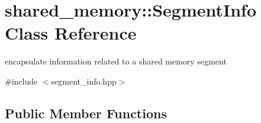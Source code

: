 \hypertarget{classshared__memory_1_1SegmentInfo}{}\section{shared\+\_\+memory\+:\+:Segment\+Info Class Reference}
\label{classshared__memory_1_1SegmentInfo}


encapsulate information related to a shared memory segment  




{\ttfamily \#include $<$segment\+\_\+info.\+hpp$>$}

\subsection*{Public Member Functions}
